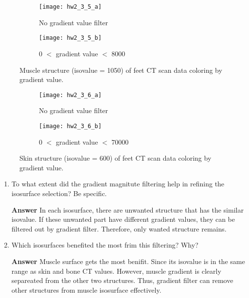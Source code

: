 \documentclass[11pt]{article}
\begin{document}
\begin{figure}[H]
\begin{subfigure}{.5\textwidth}
  \centering
  \texttt{[image: hw2\_3\_5\_a]}
  \caption{No gradient value filter}
  \label{fig:hw2_3_5_a}
\end{subfigure}
\begin{subfigure}{.5\textwidth}
  \centering
  \texttt{[image: hw2\_3\_5\_b]}
  \caption{0 $<$ gradient value $<$ 8000}
  \label{fig:hw2_3_5_b}
\end{subfigure}
\caption{Muscle structure (isovalue = 1050) of feet CT scan data coloring by gradient value.}
\end{figure}

\begin{figure}[H]
\begin{subfigure}{.5\textwidth}
  \centering
  \texttt{[image: hw2\_3\_6\_a]}
  \caption{No gradient value filter}
  \label{fig:hw2_3_6_a}
\end{subfigure}
\begin{subfigure}{.5\textwidth}
  \centering
  \texttt{[image: hw2\_3\_6\_b]}
  \caption{0 $<$ gradient value $<$ 70000}
  \label{fig:hw2_3_6_b}
\end{subfigure}
\caption{Skin structure (isovalue = 600) of feet CT scan data coloring by gradient value.}
\end{figure}

\begin{enumerate}[label=\arabic*.]

\item To what extent did the gradient magnitute filtering help in refining the isosurface selection? Be specific.

\noindent\textbf{Answer} In each isosurface, there are unwanted structure that has the similar isovalue. If these unwanted part have different gradient values, they can be filtered out by gradient filter. Therefore, only wanted structure remains.

\item Which isosurfaces benefited the most frim this filtering? Why?

\noindent\textbf{Answer} Muscle surface gets the most benifit. Since its isovalue is in the same range as skin and bone CT values. However, muscle gradient is clearly separeated from the other two structures. Thus, gradient filter can remove other structures from muscle isosurface effectively.

\end{enumerate}
\end{document}
